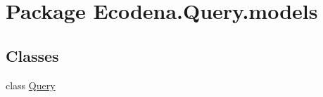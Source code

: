 \hypertarget{namespace_ecodena_1_1_query_1_1models}{
\section{Package Ecodena.Query.models}
\label{d6/d05/namespace_ecodena_1_1_query_1_1models}
}
\subsection*{Classes}
\begin{DoxyCompactItemize}
\item 
class \hyperlink{class_ecodena_1_1_query_1_1models_1_1_query}{Query}
\end{DoxyCompactItemize}
